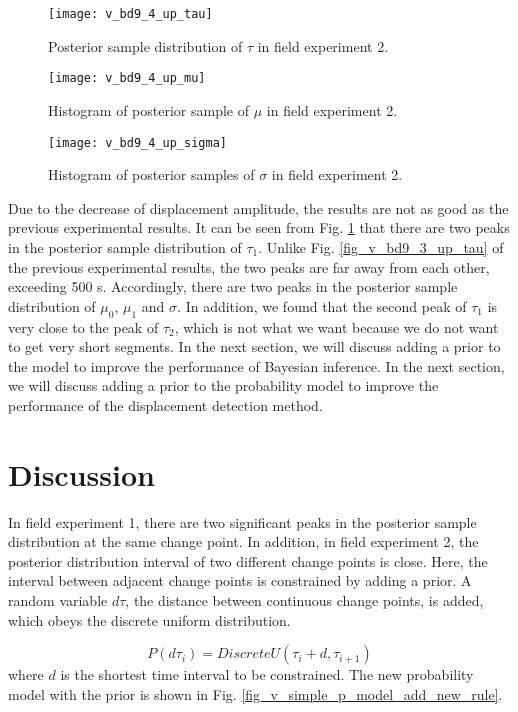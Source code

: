 \documentclass[final,3p,times]{elsarticle}
\begin{document}
	\begin{figure}[htbp]
		\centering
		\texttt{[image: v\_bd9\_4\_up\_tau]}
		\caption{Posterior sample distribution of $\tau$ in field experiment 2.}
		\label{fig_v_bd9_4_up_tau}
	\end{figure} 
	\begin{figure}[htbp]
		\centering
		\texttt{[image: v\_bd9\_4\_up\_mu]}
		\caption{Histogram of posterior sample of $\mu$ in field experiment 2.}
		\label{fig_v_bd9_4_up_mu}
	\end{figure} 
	\begin{figure}[htbp]
		\centering
		\texttt{[image: v\_bd9\_4\_up\_sigma]}
		\caption{Histogram of posterior \textcolor{r_s}{samples} of $\sigma$ in field experiment 2.}
		\label{fig_v_bd9_4_up_sigma}
	\end{figure}
	Due to the decrease of displacement amplitude, the results are not as good as the previous experimental results. 
	It can be seen from Fig. \ref{fig_v_bd9_4_up_tau} that there are two peaks in the posterior sample distribution of $\tau_1$. Unlike Fig. \ref{fig_v_bd9_3_up_tau} of the previous experimental results, the two peaks are far away from each other, exceeding 500 s. 
	Accordingly, there are two peaks in the posterior sample distribution of $\mu_0$, $\mu_1$ and $\sigma$. 
	In addition, we found that the second peak of $\tau_1$ is very close to the peak of $\tau_2$, which is not what we want because we do not want to get very short segments. 
	In the next section, we will discuss adding a prior to the model to improve the performance of Bayesian inference.
	In the next section, we will discuss adding a prior to the \textcolor{r_s}{probability} model to improve the performance of the \textcolor{r_s}{displacement detection method}.
	\section{Discussion}
	\label{disc}
	In field experiment 1, there are two significant peaks in the posterior sample distribution at the same change point. 
	In addition, in field experiment 2, the posterior distribution interval of two different change points is close.
	Here, the interval between adjacent change points is constrained by adding a prior. 
	A random variable $d\tau$, the distance between continuous change points, is added, which obeys the  discrete uniform distribution.
	
	\begin{equation}\label{eq_bayesian_prior_d_tau}
	P(d\tau_{i})=DiscreteU(\tau_{i} + d,\tau_{i+1})
	\end{equation}
	where $d$ is the shortest time interval to be constrained. The new \textcolor{r_s}{probability} model with the prior is shown in Fig. \ref{fig_v_simple_p_model_add_new_rule}.
	
\end{document}
